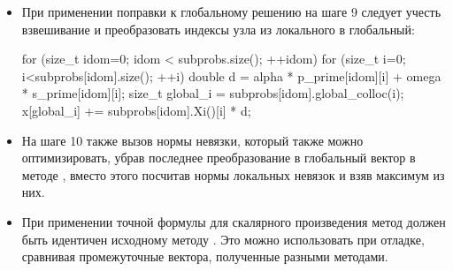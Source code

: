 \begin{itemize}
\item При применении поправки к глобальному решению  на шаге 9 следует учесть взвешивание и преобразовать индексы узла из локального в глобальный:
\begin{cppcode}
for (size_t idom=0; idom < subprobs.size(); ++idom){
	for (size_t i=0; i<subprobs[idom].size(); ++i){
		double d = alpha * p_prime[idom][i] + omega * s_prime[idom][i];
		size_t global_i = subprobs[idom].global_colloc(i);
		x[global_i] += subprobs[idom].Xi()[i] * d;
	}
}
\end{cppcode}

\item На шаге 10 также вызов нормы невязки, который также можно оптимизировать, убрав последнее преобразование в глобальный вектор в методе ,
вместо этого посчитав нормы локальных невязок и взяв максимум из них.

\item При применении точной формулы для скалярного произведения метод  должен быть идентичен исходному методу .
Это можно использовать при отладке, сравнивая промежуточные вектора, полученные разными методами.

\end{itemize}
